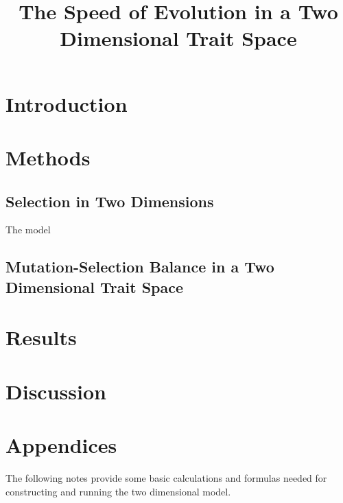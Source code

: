 \documentclass{article}
\begin{document}
\title{The Speed of Evolution in a Two Dimensional Trait Space}

\section*{Introduction}

\section*{Methods}
\subsection*{Selection in Two Dimensions}
The model 
\subsection*{Mutation-Selection Balance in a Two Dimensional Trait Space}

\section*{Results}

\section*{Discussion}

\section*{Appendices}
The following notes provide some basic calculations and formulas needed for constructing and running the two dimensional model.
\end{document}
